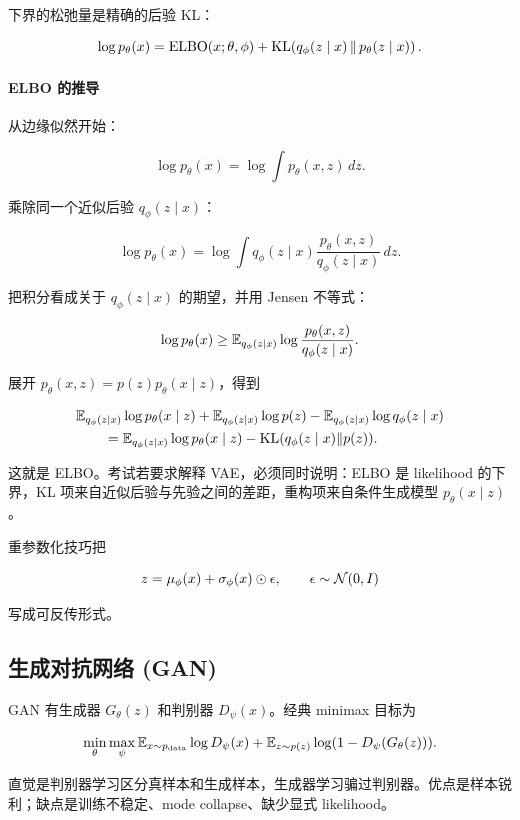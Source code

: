 \documentclass[11pt]{ctexart}
\begin{document}
下界的松弛量是精确的后验 KL：

\[
  \log p_\theta(x)=\operatorname{ELBO}(x;\theta,\phi)+\operatorname{KL}\!\left(q_\phi(z\mid x)\,\middle\|\,p_\theta(z\mid x)\right).
\]

\paragraph{ELBO 的推导}

从边缘似然开始：

\[
  \log p_\theta(x)
  =
  \log
  \int p_\theta(x,z)\,dz.
\]

乘除同一个近似后验 \(q_\phi(z\mid x)\)：

\[
  \log p_\theta(x)
  =
  \log
  \int
  q_\phi(z\mid x)
  \frac{p_\theta(x,z)}{q_\phi(z\mid x)}
  \,dz.
\]

把积分看成关于 \(q_\phi(z\mid x)\) 的期望，并用 Jensen 不等式：

\[
  \log p_\theta(x)
  \ge
  \mathbb{E}_{q_\phi(z\mid x)}
  \log
  \frac{p_\theta(x,z)}{q_\phi(z\mid x)}.
\]

展开 \(p_\theta(x,z)=p(z)p_\theta(x\mid z)\)，得到

\[
\begin{aligned}
  &\mathbb{E}_{q_\phi(z\mid x)}\log p_\theta(x\mid z)
  +
  \mathbb{E}_{q_\phi(z\mid x)}\log p(z)
  -
  \mathbb{E}_{q_\phi(z\mid x)}\log q_\phi(z\mid x)
  \\
  &\qquad =
  \mathbb{E}_{q_\phi(z\mid x)}\log p_\theta(x\mid z)
  -
  \operatorname{KL}(q_\phi(z\mid x)\|p(z)).
\end{aligned}
\]

这就是 ELBO。考试若要求解释 VAE，必须同时说明：ELBO 是 likelihood 的下界，KL 项来自近似后验与先验之间的差距，重构项来自条件生成模型 \(p_\theta(x\mid z)\)。

重参数化技巧把

\[
  z=\mu_\phi(x)+\sigma_\phi(x)\odot\epsilon,
  \qquad
  \epsilon\sim\mathcal{N}(0,I)
\]

写成可反传形式。

\subsection{生成对抗网络 (GAN)}

GAN 有生成器 \(G_\theta(z)\) 和判别器 \(D_\psi(x)\)。经典 minimax 目标为

\[
  \min_\theta\max_\psi
  \mathbb{E}_{x\sim p_{\mathrm{data}}}\log D_\psi(x)
  +
  \mathbb{E}_{z\sim p(z)}
  \log(1-D_\psi(G_\theta(z))).
\]

直觉是判别器学习区分真样本和生成样本，生成器学习骗过判别器。优点是样本锐利；缺点是训练不稳定、mode collapse、缺少显式 likelihood。
\end{document}
